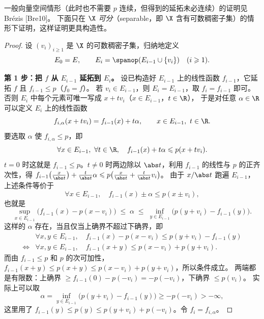 一般向量空间情形（此时也不需要 $p$ 连续，但得到的延拓未必连续）的证明见 Brézis [Bre10]。
下面只在 $\X$ \emph{可分}（separable，即 $\X$ 含有可数稠密子集）的情形下证明，这样证明更具构造性。

\begin{proof}
设 $(v_i)_{i\geqslant1}$ 是 $\X$ 的可数稠密子集，归纳地定义
\[
  E_0=E,\qquad E_i=\spanop(E_{i-1}\cup\{v_i\})\quad(i\geqslant1).
\]

\textbf{第 1 步：把 $f$ 从 $E_{i-1}$ 延拓到 $E_i$。}
设已构造好 $E_{i-1}$ 上的线性函数 $f_{i-1}$，它延拓 $f$ 且 $f_{i-1}\leqslant p$（$f_0=f$）。
若 $v_i\in E_{i-1}$，则 $E_i=E_{i-1}$，取 $f_i=f_{i-1}$ 即可。否则 $E_i$ 中每个元素可唯一写成 $x+tv_i$（$x\in E_{i-1}$，$t\in\R$），
于是对任意 $\alpha\in\R$ 可以定义 $E_i$ 上的线性函数
\[
  f_{i,\alpha}(x+tv_i)=f_{i-1}(x)+t\alpha,\qquad x\in E_{i-1},\ t\in\R .
\]
要选取 $\alpha$ 使 $f_{i,\alpha}\leqslant p$，即
\[
  \forall x\in E_{i-1},\ \forall t\in\R,\quad f_{i-1}(x)+t\alpha\leqslant p(x+tv_i).
\]
$t=0$ 时这就是 $f_{i-1}\leqslant p$。$t\neq0$ 时两边除以 $\abs t$，利用 $f_{i-1}$ 的线性与 $p$ 的正齐次性，得
$f_{i-1}\bigl(\tfrac{x}{\abs t}\bigr)+\tfrac{t}{\abs t}\alpha\leqslant p\bigl(\tfrac{x}{\abs t}+\tfrac{t}{\abs t}v_i\bigr)$。
由于 $x/\abs t$ 跑遍 $E_{i-1}$，上述条件等价于
\[
  \forall x\in E_{i-1},\quad f_{i-1}(x)\pm\alpha\leqslant p(x\pm v_i),
\]
也就是
\[
  \sup_{x\in E_{i-1}}\bigl(f_{i-1}(x)-p(x-v_i)\bigr)\;\leqslant\;\alpha\;\leqslant\;\inf_{y\in E_{i-1}}\bigl(p(y+v_i)-f_{i-1}(y)\bigr).
\]
这样的 $\alpha$ 存在，当且仅当上确界不超过下确界，即
\[
  \begin{aligned}
    &\forall x,y\in E_{i-1},\quad f_{i-1}(x)-p(x-v_i)\leqslant p(y+v_i)-f_{i-1}(y)\\
    \iff{}&\forall x,y\in E_{i-1},\quad f_{i-1}(x+y)\leqslant p(x-v_i)+p(y+v_i).
  \end{aligned}
\]
而由 $f_{i-1}\leqslant p$ 和 $p$ 的次可加性，$f_{i-1}(x+y)\leqslant p(x+y)\leqslant p(x-v_i)+p(y+v_i)$，所以条件成立。
两端都是有限数：上确界 $\geqslant f_{i-1}(0)-p(-v_i)=-p(-v_i)$，下确界 $\leqslant p(v_i)$。
实际上可以取
\[
  \alpha=\inf_{y\in E_{i-1}}\bigl(p(y+v_i)-f_{i-1}(y)\bigr)\geqslant-p(-v_i)>-\infty,
\]
这里用了 $f_{i-1}(y)\leqslant p(y)\leqslant p(y+v_i)+p(-v_i)$。令 $f_i=f_{i,\alpha}$。


\end{proof}
